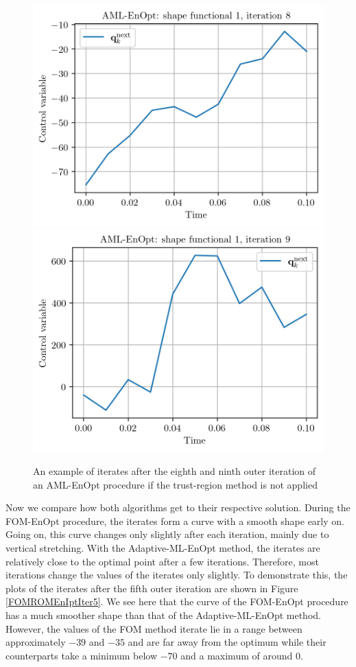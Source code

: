 \begin{figure}
\centering
\includegraphics{Plots/noTRIteration8.png}
\includegraphics{Plots/noTRIteration9.png}
\caption{\label{noTRResults}An example of iterates after the eighth and ninth outer iteration of an AML-EnOpt procedure if the trust-region method is not applied}
\end{figure}

Now we compare how both algorithms get to their respective solution. During the FOM-EnOpt procedure, the iterates form a curve with a smooth shape early on. Going on, this curve changes only slightly after each iteration, mainly due to vertical stretching. With the Adaptive-ML-EnOpt method, the iterates are relatively close to the optimal point after a few iterations. Therefore, most iterations change the values of the iterates only slightly. To demonstrate this, the plots of the iterates after the fifth outer iteration are shown in Figure \ref{FOMROMEnIptIter5}. We see here that the curve of the FOM-EnOpt procedure has a much smoother shape than that of the Adaptive-ML-EnOpt method. However, the values of the FOM method iterate lie in a range between approximately $-39$ and $-35$ and are far away from the optimum while their counterparts take a minimum below $-70$ and a maximum of around $0$.\\

